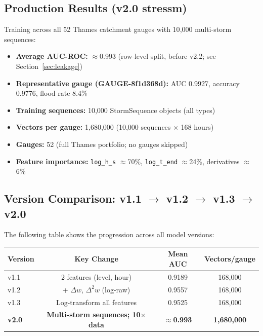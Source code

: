 \documentclass[11pt,a4paper]{article}
\begin{document}
\subsection{Production Results (v2.0 stressm)}
Training across all 52 Thames catchment gauges with 10{,}000 multi-storm sequences:

\begin{itemize}[nosep]
    \item \textbf{Average AUC-ROC:} $\approx$0.993 (row-level split, before v2.2;
          see Section~\ref{sec:leakage})
    \item \textbf{Representative gauge (GAUGE-8f1d368d):} AUC 0.9927,
          accuracy 0.9776, flood rate 8.4\%
    \item \textbf{Training sequences:} 10{,}000 StormSequence objects (all types)
    \item \textbf{Vectors per gauge:} 1{,}680{,}000 (10{,}000 sequences $\times$ 168 hours)
    \item \textbf{Gauges:} 52 (full Thames portfolio; no gauges skipped)
    \item \textbf{Feature importance:} \texttt{log\_h\_s} $\approx$70\%,
          \texttt{log\_t\_end} $\approx$24\%, derivatives $\approx$6\%
\end{itemize}

\subsection{Version Comparison: v1.1 $\to$ v1.2 $\to$ v1.3 $\to$ v2.0}

The following table shows the progression across all model versions:

\begin{center}
\begin{tabular}{lccc}
\toprule
\textbf{Version} & \textbf{Key Change} & \textbf{Mean AUC} & \textbf{Vectors/gauge} \\
\midrule
v1.1 & 2 features (level, hour) & 0.9189 & 168{,}000 \\
v1.2 & + $\Delta w$, $\Delta^2 w$ (log-raw) & 0.9557 & 168{,}000 \\
v1.3 & Log-transform all features & 0.9525 & 168{,}000 \\
\textbf{v2.0} & \textbf{Multi-storm sequences; 10$\times$ data} & $\approx$\textbf{0.993} & \textbf{1{,}680{,}000} \\
\bottomrule
\end{tabular}
\end{center}
\end{document}
